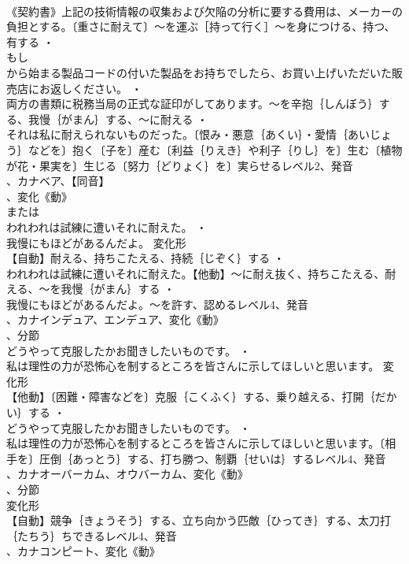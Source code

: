 \documentclass[8pt]{extreport}
\begin{document}
\begin{CJK}{UTF8}{min}
\\	《契約書》上記の技術情報の収集および欠陥の分析に要する費用は、メーカーの負担とする。〔重さに耐えて〕～を運ぶ［持って行く］～を身につける、持つ、有する ・
\\	もし
\\	から始まる製品コードの付いた製品をお持ちでしたら、お買い上げいただいた販売店にお返しください。 ・
\\	両方の書類に税務当局の正式な証印がしてあります。～を辛抱｛しんぼう｝する、我慢｛がまん｝する、～に耐える ・
\\	それは私に耐えられないものだった。〔恨み・悪意｛あくい｝・愛情｛あいじょう｝などを〕抱く〔子を〕産む〔利益｛りえき｝や利子｛りし｝を〕生む〔植物が花・果実を〕生じる〔努力｛どりょく｝を〕実らせるレベル2、発音
\\	、カナベア、【同音】
\\	、変化《動》
\\	または
\\	われわれは試練に遭いそれに耐えた。 ・
\\	我慢にもほどがあるんだよ。	変化形 
\\	【自動】耐える、持ちこたえる、持続｛じぞく｝する ・
\\	われわれは試練に遭いそれに耐えた。【他動】～に耐え抜く、持ちこたえる、耐える、～を我慢｛がまん｝する ・
\\	我慢にもほどがあるんだよ。～を許す、認めるレベル4、発音
\\	、カナインデュア、エンデュア、変化《動》
\\	、分節
\\	どうやって克服したかお聞きしたいものです。 ・
\\	私は理性の力が恐怖心を制するところを皆さんに示してほしいと思います。	変化形 
\\	【他動】〔困難・障害などを〕克服｛こくふく｝する、乗り越える、打開｛だかい｝する ・
\\	どうやって克服したかお聞きしたいものです。 ・
\\	私は理性の力が恐怖心を制するところを皆さんに示してほしいと思います。〔相手を〕圧倒｛あっとう｝する、打ち勝つ、制覇｛せいは｝するレベル4、発音
\\	、カナオーバーカム、オウバーカム、変化《動》
\\	、分節
\\	変化形 
\\	【自動】競争｛きょうそう｝する、立ち向かう匹敵｛ひってき｝する、太刀打｛たちう｝ちできるレベル4、発音
\\	、カナコンピート、変化《動》

\end{CJK}
\end{document}
